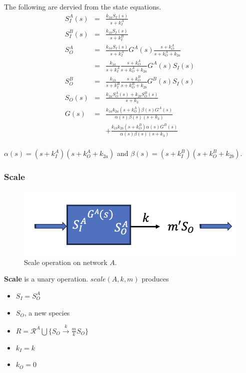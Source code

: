 \documentclass[unnumsec,webpdf,contemporary,large]{oup-authoring-template}%
\theoremstyle{thmstyleone}%
\theoremstyle{thmstyletwo}%
\theoremstyle{thmstylethree}%
\begin{document}
The following are dervied from the state equations.
\begin{eqnarray}
S^A_I(s) & = & \frac{k_{1a} S_I (s)}{s + k^A_I} \nonumber \\
S^B_I(s) & = & \frac{k_{1b} S_I (s)}{s + k^B_I} \nonumber \\
S^A_O & = & \frac{k_{1a} S_I (s)}{s + k^A_I} G^A(s) \frac{s + k^A_O}{s + k^A_O + k_{2a}} \nonumber\\
   & = & \frac{k_{1a}}{s + k^A_I} \frac{s + k^A_O}{s + k^A_O + k_{2a}}  G^A(s) S_I (s) \nonumber \\
S^B_O
   & = & \frac{k_{1b}}{s + k^B_I} \frac{s + k^B_O}{s + k^B_O + k_{2b}}  G^B(s) S_I (s) \nonumber \\
S_O (s) & = & \frac{k_{2a} S^A_O(s) + k_{2b} S^B_O(s) }{s + k_3} \nonumber \\
G(s) & = & \frac{k_{1a} k_{2a} (s + k^A_O) \beta(s) G^A(s) }{\alpha(s) \beta(s) (s + k_3)} \nonumber \\
& & +  \frac{k_{1b}  k_{2b} (s + k^B_O)\alpha(s) G^B(s) }{\alpha(s) \beta(s) (s + k_3)} \\
\end{eqnarray}

$\alpha(s) = (s + k^A_I) (s + k^A_O + k_{2a})$ and
$\beta(s) = (s + k^B_I) (s + k^B_O + k_{2b})$.

\subsubsection{Scale}
\begin{figure}
         \centering
         \includegraphics[scale=0.4]{figures/scale.png}
          \caption[]{Scale operation on network $A$.}
         \label{fig:scale}
\end{figure}
{\bf Scale} is a unary operation.
$scale(A, k, m)$ produces 
\begin{itemize}
\item $S_I = S^A_O$
\item $S_O$, a new species
\item $R = \mathcal{R}^A \bigcup \{S_O \xrightarrow{k} \frac{m}{k} S_O\}$
\item $k_I = k$
\item $k_O = 0$
\end{itemize}
\end{document}

